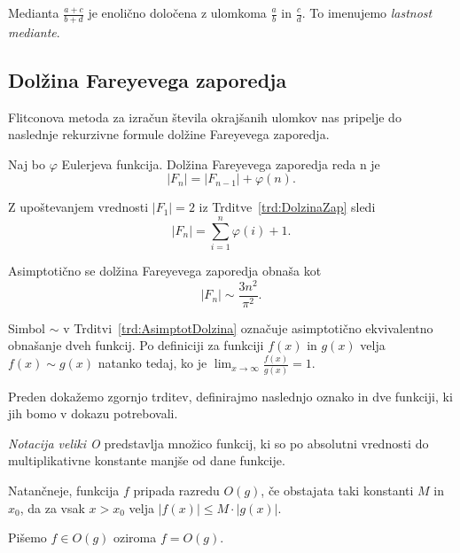 \documentclass[mat1]{fmfdelo}
\begin{document}
\begin{opomba}
Medianta $\frac{a+c}{b+d}$ je enolično določena z ulomkoma $\frac{a}{b}$ in $\frac{c}{d}$. To imenujemo \emph{lastnost mediante}.
\end{opomba}

%
\subsection{Dolžina Fareyevega zaporedja}

Flitconova metoda za izračun števila okrajšanih ulomkov nas pripelje do naslednje rekurzivne formule dolžine Fareyevega zaporedja.

\begin{trditev}
\label{trd:DolzinaZap}
Naj bo $\varphi$ Eulerjeva funkcija. Dolžina Fareyevega zaporedja reda n je
\[  |F_{n}| = |F_{n-1}| + \varphi(n). \]
\end{trditev}

\begin{opomba}
\label{op:AsimptotDolzina}
Z upoštevanjem vrednosti $|F_{1}| = 2$ iz Trditve~\ref{trd:DolzinaZap} sledi \[  |F_{n}| = \sum_{i=1}^n \varphi(i) + 1. \]
\end{opomba}

\begin{trditev}
\label{trd:AsimptotDolzina}
Asimptotično se dolžina Fareyevega zaporedja obnaša kot
\[  |F_{n}|\sim\frac{3n^2}{\pi^2}. \]
\end{trditev}

\begin{opomba}
Simbol $\sim$ v Trditvi~\ref{trd:AsimptotDolzina} označuje asimptotično ekvivalentno obnašanje dveh funkcij.
Po definiciji za funkciji $f(x)$ in $g(x)$ velja $f(x) \sim g(x)$ natanko tedaj, ko je $ \lim_{x \to \infty} \frac{f(x)}{g(x)} = 1$.
\end{opomba}

%
Preden dokažemo zgornjo trditev, definirajmo naslednjo oznako in dve funkciji, ki jih bomo v dokazu potrebovali.

\begin{definicija}
\emph{Notacija veliki O} predstavlja množico funkcij, ki so po absolutni vrednosti do multiplikativne konstante manjše od dane funkcije.

Natančneje, funkcija $f$ pripada razredu $O(g)$, če obstajata taki konstanti $M$ in $x_{0}$, da za vsak $x > x_{0}$ velja $|f(x)| \leq M \cdot |g(x)|$.

Pišemo $f \in O(g)$ oziroma $f = O(g)$.
\end{definicija}
\end{document}
